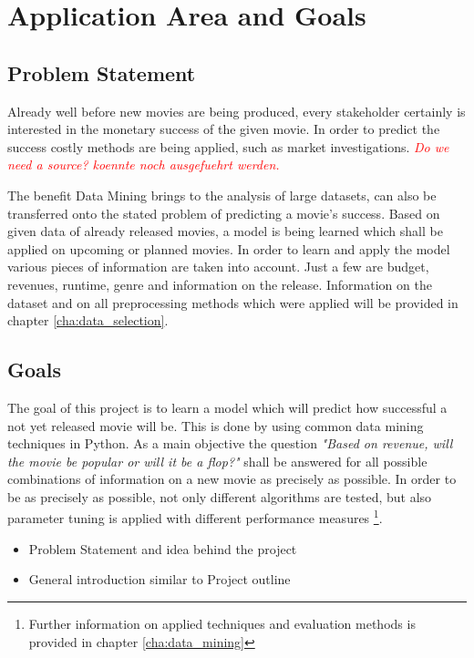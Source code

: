 \chapter{Application Area and Goals}
\label{cha:area_goals}
\section{Problem Statement}
Already well before new movies are being produced, every stakeholder certainly is interested in the monetary success of the given movie. In order to predict the success costly methods are being applied, such as market investigations. \textcolor{red}{\textit{Do we need a source? koennte noch ausgefuehrt werden.}}

The benefit Data Mining brings to the analysis of large datasets, can also be transferred onto the stated problem of predicting a movie's success. Based on given data of already released movies, a model is being learned which shall be applied on upcoming or planned movies. In order to learn and apply the model various pieces of information are taken into account. Just a few are budget, revenues, runtime, genre and information on the release. Information on the dataset and on all preprocessing methods which were applied will be provided in chapter \ref{cha:data_selection}.

\section{Goals}
The goal of this project is to learn a model which will predict how successful a not yet released movie will be. This is done by using common data mining techniques in Python. As a main objective the question \textit{"Based on revenue, will the movie be popular or will it be a flop?"} shall be answered for all possible combinations of information on a new movie as precisely as possible.
In order to be as precisely as possible, not only different algorithms are tested, but also parameter tuning is applied with different performance measures \footnote{Further information on applied techniques and evaluation methods is provided in chapter \ref{cha:data_mining}}.


\begin{itemize}
	\item Problem Statement and idea behind the project
	\item General introduction similar to Project outline
\end{itemize}

